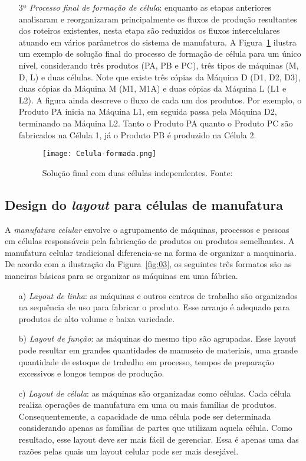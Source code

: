 \begin{enumerate}
\item[3ª] \textit{Processo final de formação de célula}: enquanto as etapas anteriores analisaram e reorganizaram principalmente os fluxos de produção resultantes dos roteiros existentes, nesta etapa são reduzidos os fluxos intercelulares atuando em vários parâmetros do sistema de manufatura. A Figura~\ref{fig:07} ilustra um exemplo de solução final do processo de formação de célula para um único nível, considerando três produtos (PA, PB e PC), três tipos de máquinas (M, D, L) e duas células. Note que existe três cópias da Máquina D (D1, D2, D3), duas cópias da Máquina M (M1, M1A) e duas cópias da Máquina L (L1 e L2). A figura ainda descreve o fluxo de cada um dos produtos. Por exemplo, o Produto PA inicia na Máquina L1, em seguida passa pela Máquina D2, terminando na Máquina L2. Tanto o Produto PA quanto o Produto PC são fabricados na Célula 1, já o Produto PB é produzido na Célula 2.   
\begin{figure}[t]
\begin{center}
\texttt{[image: Celula-formada.png]}
\caption{Solução final com duas células independentes. Fonte:~\cite{irani1999handbook}}\label{fig:07}
\end{center}
\end{figure}
    
\end{enumerate}
\subsection{Design do {\it layout} para células de manufatura}

A {\it manufatura celular} envolve o agrupamento de máquinas, processos e pessoas em células responsáveis pela fabricação de produtos ou produtos semelhantes. A manufatura celular tradicional diferencia-se na forma de organizar a maquinaria. De acordo com a ilustração da Figura~\ref{fig:03}, os seguintes três formatos são as maneiras básicas para se organizar as máquinas em uma fábrica.

\begin{enumerate}
\item[a)] {\it Layout de linha}: as máquinas e outros centros de trabalho são organizados na sequência de uso para fabricar o produto. Esse arranjo é adequado para produtos de alto volume e baixa variedade.
\item[b)] {\it Layout de função}: as máquinas do mesmo tipo são agrupadas. Esse layout pode resultar em grandes quantidades de manuseio de materiais, uma grande quantidade de estoque de trabalho em processo, tempos de preparação excessivos e longos tempos de produção.
\item[c)] {\it Layout de célula}: as máquinas são organizadas como células. Cada célula realiza operações de manufatura em uma ou mais famílias de produtos. Consequentemente, a capacidade de uma célula pode ser determinada considerando apenas as famílias de partes que utilizam aquela célula. Como resultado, esse layout deve ser mais fácil de gerenciar. Essa é apenas uma das razões pelas quais um layout celular pode ser mais desejável.
\end{enumerate}

